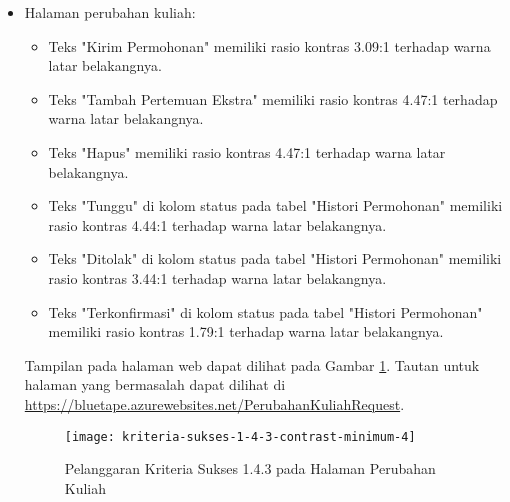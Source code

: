\begin{itemize}
    \item Halaman perubahan kuliah: 
    \begin{itemize}
        \item Teks "Kirim Permohonan" memiliki rasio kontras 3.09:1 terhadap warna latar belakangnya.
        \item Teks "Tambah Pertemuan Ekstra" memiliki rasio kontras 4.47:1 terhadap warna latar belakangnya.
        \item Teks "Hapus" memiliki rasio kontras 4.47:1 terhadap warna latar belakangnya.
        \item Teks "Tunggu" di kolom status pada tabel "Histori Permohonan" memiliki rasio kontras 4.44:1 terhadap warna latar belakangnya.
        \item Teks "Ditolak" di kolom status pada tabel "Histori Permohonan" memiliki rasio kontras 3.44:1 terhadap warna latar belakangnya.
        \item Teks "Terkonfirmasi" di kolom status pada tabel "Histori Permohonan" memiliki rasio kontras 1.79:1 terhadap warna latar belakangnya.
    \end{itemize}
    Tampilan pada halaman web dapat dilihat pada Gambar \ref{fig:1.4.3_contrast_minimum_4}. Tautan untuk halaman yang bermasalah dapat dilihat di \url{https://bluetape.azurewebsites.net/PerubahanKuliahRequest}.
    \begin{figure}[H]
        \centering  
        \texttt{[image: kriteria-sukses-1-4-3-contrast-minimum-4]}  
        \caption[Pelanggaran Kriteria Sukses 1.4.3 pada Halaman Perubahan Kuliah]{Pelanggaran Kriteria Sukses 1.4.3 pada Halaman Perubahan Kuliah}
        \label{fig:1.4.3_contrast_minimum_4}  
    \end{figure} 
    

\end{itemize}
